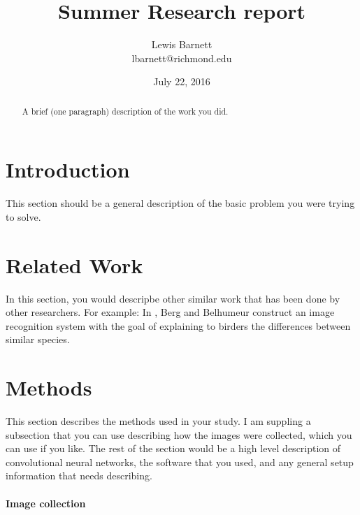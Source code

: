 \documentclass[11pt,twocolumn]{article}
\title{Summer Research report}
\author{
  Lewis Barnett\\
  lbarnett@richmond.edu
}
\date{July 22, 2016}
\begin{document}
\maketitle
\begin{abstract}
  A brief (one paragraph) description of the work you did.
\end{abstract}


\section{Introduction}

This section should be a general description of the basic problem you
were trying to solve. 


\section{Related Work}

In this section, you would descripbe other similar work that has been
done by other researchers. For example: 
In \cite{BIRDID:Berg2013}, Berg and Belhumeur construct an image recognition
system with the goal of explaining to birders the differences between
similar species.

\section{Methods}
\label{sec:methods}

This section describes the methods used in your study. I am suppling
a subsection that you can use describing how the images were collected,
which you can use if you like. The rest of the section would be a
high level description of convolutional neural networks, the software
that you used, and any general setup information that needs
describing.

\paragraph{Image collection}
\end{document}
